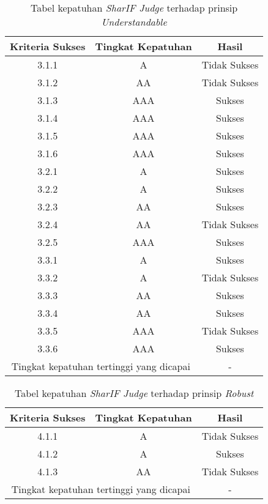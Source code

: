 \begin{table}[H]
	\centering
	\caption{Tabel kepatuhan \textit{SharIF Judge} terhadap prinsip \textit{Understandable}}
	\label{tab:kepatuhan_sharif_judge_understandable}
	\begin{tabular}{|c|c|c|}
		\hline
		Kriteria Sukses & Tingkat Kepatuhan & Hasil\\
		\hline
		\rowcolor{Pink} 3.1.1 & A & Tidak Sukses\\
		\rowcolor{LightRed} 3.1.2 & AA & Tidak Sukses\\
		3.1.3 & AAA& Sukses\\
		3.1.4 & AAA & Sukses\\
		3.1.5 & AAA & Sukses\\
		3.1.6 & AAA & Sukses\\
		3.2.1 & A & Sukses\\
		3.2.2 & A & Sukses\\
		3.2.3 & AA & Sukses\\
		\rowcolor{LightRed} 3.2.4 & AA & Tidak Sukses\\
		3.2.5 & AAA & Sukses\\
		3.3.1 & A & Sukses\\
		\rowcolor{Pink} 3.3.2 & A & Tidak Sukses\\
		3.3.3 & AA & Sukses\\
		3.3.4 & AA & Sukses\\
		\rowcolor{Red} 3.3.5 & AAA & Tidak Sukses\\
		3.3.6 & AAA & Sukses\\
		\hline
		\multicolumn{2}{|c|}{Tingkat kepatuhan tertinggi yang dicapai} & - \\
		\hline
	\end{tabular}
\end{table}

\begin{table}[H]
	\centering
	\caption{Tabel kepatuhan \textit{SharIF Judge} terhadap prinsip \textit{Robust}}
	\label{tab:kepatuhan_sharif_judge_robust}
	\begin{tabular}{|c|c|c|}
		\hline
		Kriteria Sukses & Tingkat Kepatuhan & Hasil\\
		\hline
		\rowcolor{Pink} 4.1.1 & A & Tidak Sukses\\
		4.1.2 & A & Sukses\\
		\rowcolor{LightRed} 4.1.3 & AA & Tidak Sukses\\
		\hline
		\multicolumn{2}{|c|}{Tingkat kepatuhan tertinggi yang dicapai} & - \\
		\hline
	\end{tabular}
\end{table}

